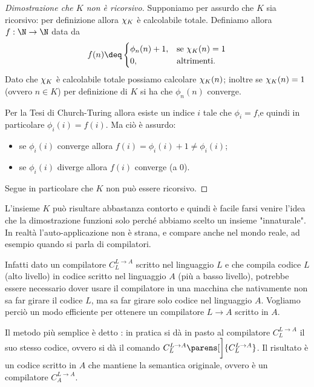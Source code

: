 \begin{proof}[Dimostrazione che $K$ non è ricorsivo]
    Supponiamo per assurdo che $K$ sia ricorsivo: per definizione allora $\chi_{K}$ è calcolabile totale. Definiamo allora $f : \N \to \N$ data da \[
        f(n) \deq \begin{cases}
            \phi_n(n) + 1, &\text{se } \charf{K}(n) = 1\\
            0, &\text{altrimenti.}
        \end{cases}
    \] Dato che $\chi_{K}$ è calcolabile totale possiamo calcolare $\chi_{K}(n)$; inoltre se $\chi_{K}(n) = 1$ (ovvero $n \in K$) per definizione di $K$ si ha che $\phi_n(n)$ converge.
    
    Per la Tesi di Church-Turing allora esiste un indice $i$ tale che $\phi_i = f$,e quindi in particolare $\phi_i(i) = f(i)$. Ma ciò è assurdo: \begin{itemize}
        \item se $\phi_i(i)$ converge allora $f(i) = \phi_i(i) + 1 \neq \phi_i(i)$;
        \item se $\phi_i(i)$ diverge allora $f(i)$ converge (a $0$).   
    \end{itemize}
    Segue in particolare che $K$ non può essere ricorsivo. 
\end{proof}

 L'insieme $K$ può risultare abbastanza contorto e quindi è facile farsi venire l'idea che la dimostrazione funzioni solo perché abbiamo scelto un insieme "innaturale". In realtà l'auto-applicazione non è strana, e compare anche nel mondo reale, ad esempio quando si parla di compilatori.

Infatti dato un compilatore $C_L^{L \to A}$ scritto nel linguaggio $L$ e che compila codice $L$ (alto livello) in codice scritto nel linguaggio $A$ (più a basso livello), potrebbe essere necessario dover usare il compilatore in una macchina che nativamente non sa far girare il codice $L$, ma sa far girare solo codice nel linguaggio $A$. Vogliamo perciò un modo efficiente per ottenere un compilatore $L \to A$ scritto in $A$.

Il metodo più semplice è detto : in pratica si dà in pasto al compilatore $C_L^{L \to A}$ il suo stesso codice, ovvero si dà il comando $C_L^{L\to A}\parens[\bigg]{C_L^{L \to A}}$. Il risultato è un codice scritto in $A$ che mantiene la semantica originale, ovvero è un compilatore $C_A^{L \to A}$.

